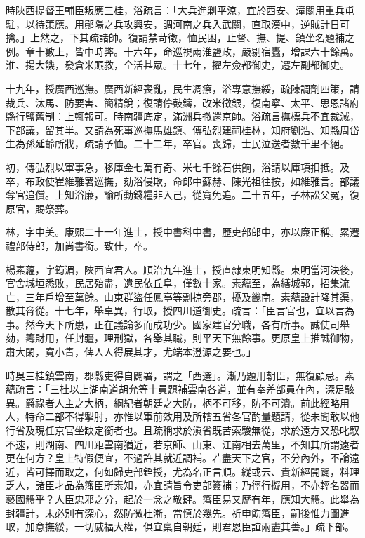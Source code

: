 \begin{pinyinscope}
時陜西提督王輔臣叛應三桂，浴疏言：「大兵進剿平涼，宜於西安、潼關用重兵屯駐，以待策應。用鄖陽之兵攻興安，調河南之兵入武關，直取漢中，逆賊計日可擒。」上然之，下其疏諸帥。復請禁苛徵，恤民困，止督、撫、提、鎮坐名題補之例。章十數上，皆中時弊。十六年，命巡視兩淮鹽政，嚴剔宿蠹，增課六十餘萬。淮、揚大饑，發倉米賑救，全活甚眾。十七年，擢左僉都御史，遷左副都御史。

十九年，授廣西巡撫。廣西新經喪亂，民生凋瘵，浴專意撫綏，疏陳調劑四策，請裁兵、汰馬、防要害、簡精銳；復請停鼓鑄，改米徵銀，復南寧、太平、思恩諸府縣行鹽舊制：上輒報可。時南疆底定，滿洲兵撤還京師。浴疏言撫標兵不宜裁減，下部議，留其半。又請為死事巡撫馬雄鎮、傅弘烈建祠桂林，知府劉浩、知縣周岱生為孫延齡所戕，疏請予恤。二十二年，卒官。喪歸，士民泣送者數千里不絕。

初，傅弘烈以軍事急，移庫金七萬有奇、米七千餘石供餉，浴請以庫項扣抵。及卒，布政使崔維雅署巡撫，劾浴侵欺，命郎中蘇赫、陳光祖往按，如維雅言。部議奪官追償。上知浴廉，諭所動錢糧非入己，從寬免追。二十五年，子林訟父冤，復原官，賜祭葬。

林，字中美。康熙二十一年進士，授中書科中書，歷吏部郎中，亦以廉正稱。累遷禮部侍郎，加尚書銜。致仕，卒。

楊素蘊，字筠湄，陜西宜君人。順治九年進士，授直隸東明知縣。東明當河決後，官舍城垣悉敗，民居殆盡，遺民依丘阜，僅數十家。素蘊至，為繕城郭，招集流亡，三年戶增至萬餘。山東群盜任鳳亭等剽掠旁郡，擾及畿南。素蘊設計降其渠，散其脅從。十七年，舉卓異，行取，授四川道御史。疏言：「臣言官也，宜以言為事。然今天下所患，正在議論多而成功少。國家建官分職，各有所事。誠使司舉劾，籌財用，任封疆，理刑獄，各舉其職，則平天下無餘事。更原皇上推誠御物，肅大閑，寬小眚，俾人人得展其才，尤端本澄源之要也。」

時吳三桂鎮雲南，郡縣吏得自闢署，謂之「西選」。漸乃題用朝臣，無復顧忌。素蘊疏言：「三桂以上湖南道胡允等十員題補雲南各道，並有奉差部員在內，深足駭異。爵祿者人主之大柄，綱紀者朝廷之大防，柄不可移，防不可潰。前此經略用人，特命二部不得掣肘，亦惟以軍前效用及所轄五省各官酌量題請，從未聞敢以他行省及現任京官坐缺定銜者也。且疏稱求於滇省既苦索駿無從，求於遠方又恐叱馭不速，則湖南、四川距雲南猶近，若京師、山東、江南相去萬里，不知其所謂遠者更在何方？皇上特假便宜，不過許其就近調補。若盡天下之官，不分內外，不論遠近，皆可擇而取之，何如歸吏部銓授，尤為名正言順。縱或云、貴新經開闢，料理乏人，諸臣才品為籓臣所素知，亦宜請旨令吏部簽補；乃徑行擬用，不亦輕名器而褻國體乎？人臣忠邪之分，起於一念之敬肆。籓臣易又歷有年，應知大體。此舉為封疆計，未必別有深心，然防微杜漸，當慎於幾先。祈申飭籓臣，嗣後惟力圖進取，加意撫綏，一切威福大權，俱宜稟自朝廷，則君恩臣誼兩盡其善。」疏下部。


\end{pinyinscope}
